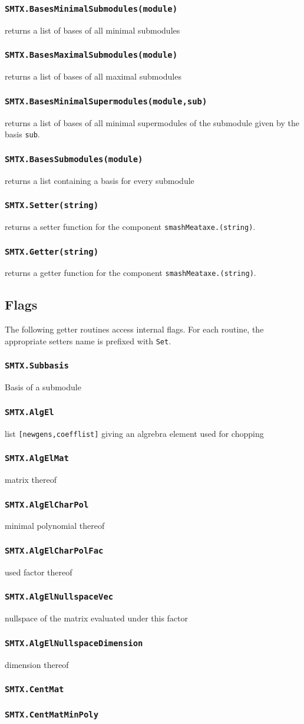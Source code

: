 \documentclass[12pt]{article}
\def\smtxcmd#1{\subsubsection*{{\tt #1}}}
\begin{document}
\smtxcmd{SMTX.BasesMinimalSubmodules(module)}
returns a list of bases of all minimal submodules

\smtxcmd{SMTX.BasesMaximalSubmodules(module)}
returns a list of bases of all maximal submodules

\smtxcmd{SMTX.BasesMinimalSupermodules(module,sub)}
returns a list of bases of all minimal supermodules of the submodule given by
the basis {\tt sub}.

\smtxcmd{SMTX.BasesSubmodules(module)}
returns a list containing a basis for every submodule

\smtxcmd{SMTX.Setter(string)}
returns a setter function for the component {\tt smashMeataxe.(string)}.

\smtxcmd{SMTX.Getter(string)}
returns a getter function for the component {\tt smashMeataxe.(string)}.

\subsection*{Flags}

The following getter routines access internal flags. For each routine, the
appropriate setters name is prefixed with {\tt Set}.

\smtxcmd{SMTX.Subbasis}
Basis of a submodule

\smtxcmd{SMTX.AlgEl}
list {\tt[newgens,coefflist]} giving an algrebra element used for chopping

\smtxcmd{SMTX.AlgElMat}
matrix thereof

\smtxcmd{SMTX.AlgElCharPol}
minimal polynomial thereof

\smtxcmd{SMTX.AlgElCharPolFac}
used factor thereof

\smtxcmd{SMTX.AlgElNullspaceVec}
nullspace of the matrix evaluated under this factor

\smtxcmd{SMTX.AlgElNullspaceDimension}
dimension thereof

\smtxcmd{SMTX.CentMat}

\smtxcmd{SMTX.CentMatMinPoly}

\newpage
\end{document}
